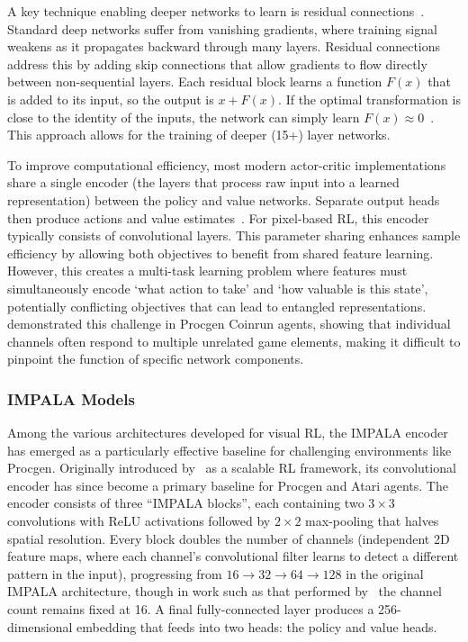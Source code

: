 A key technique enabling deeper networks to learn is residual connections~\citep{he_2015_deep}. Standard deep networks suffer from vanishing gradients, where training signal weakens as it propagates backward through many layers. Residual connections address this by adding skip connections that allow gradients to flow directly between non-sequential layers. Each residual block learns a function $F(x)$ that is added to its input, so the output is $x + F(x)$. If the optimal transformation is close to the identity of the inputs, the network can simply learn $F(x) \approx 0$~\citep{he_2016_identity}. This approach allows for the training of deeper (15+) layer networks.

To improve computational efficiency, most modern actor-critic implementations share a single encoder (the layers that process raw input into a learned representation) between the policy and value networks. Separate output heads then produce actions and value estimates~\citep{mnih_2016_asynchronous,pmlr-v80-espeholt18a,schulman_2017_proximal}. For pixel-based RL, this encoder typically consists of convolutional layers. This parameter sharing enhances sample efficiency by allowing both objectives to benefit from shared feature learning. However, this creates a multi-task learning problem where features must simultaneously encode `what action to take' and `how valuable is this state', potentially conflicting objectives that can lead to entangled representations.~\citet{hilton_2020_understanding} demonstrated this challenge in Procgen Coinrun agents, showing that individual channels often respond to multiple unrelated game elements, making it difficult to pinpoint the function of specific network components.

\subsubsection{IMPALA Models}\label{subsubsec:impala_models}

Among the various architectures developed for visual RL, the IMPALA encoder has emerged as a particularly effective baseline for challenging environments like Procgen. Originally introduced by~\citet{pmlr-v80-espeholt18a} as a scalable RL framework, its convolutional encoder has since become a primary baseline for Procgen and Atari agents. The encoder consists of three ``IMPALA blocks'', each containing two $3\times3$ convolutions with ReLU activations followed by $2\times2$ max-pooling that halves spatial resolution. Every block doubles the number of channels (independent 2D feature maps, where each channel's convolutional filter learns to detect a different pattern in the input), progressing from $16\to32\to64\to128$ in the original IMPALA architecture, though in work such as that performed by~\citet{mini_2023_understanding} the channel count remains fixed at 16. A final fully-connected layer produces a 256-dimensional embedding that feeds into two heads: the policy and value heads.


